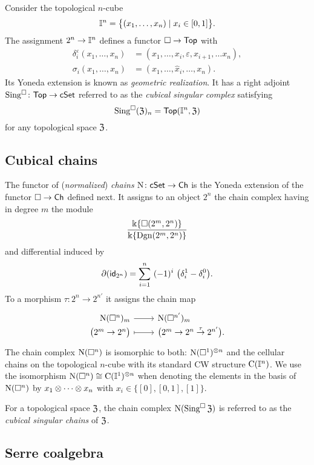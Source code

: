 Consider the topological $n$-cube
\[
\mathbb{I}^{n} = \big\{ (x_1, \dots, x_n) \mid x_i \in [0,1] \big\}.
\]
The assignment $2^n \to \mathbb{I}^n$ defines a functor $\square \to \mathsf{Top}$ with
\begin{align*}
\delta^\varepsilon_i(x_1, \dots, x_n) &= (x_1, \dots, x_i, \varepsilon, x_{i+1}, \dots x_n), \\
\sigma_i(x_1,\dots,x_n) &= (x_1, \dots, \widehat{x}_i, \dots, x_n).
\end{align*}
Its Yoneda extension is known as \textit{geometric realization}.
It has a right adjoint $\operatorname{Sing^{\square}} \colon \mathsf{Top} \to \mathsf{cSet}$ referred to as the \textit{cubical singular complex} satisfying
\[
\operatorname{Sing^{\square}}(\mathfrak{Z})_n = \mathsf{Top}(\mathbb{I}^n, \mathfrak{Z})
\]
for any topological space $\mathfrak{Z}$.

\subsection{Cubical chains}

The functor of (\textit{normalized}) \textit{chains} $\operatorname{N} \colon \mathsf{cSet} \to \mathsf{Ch}$ is the Yoneda extension of the functor $\square \to \mathsf{Ch}$ defined next.
It assigns to an object $2^n$ the chain complex having in degree $m$ the module
\[
\frac{\Bbbk\{\square(2^m, 2^n)\}}{\Bbbk\{\mathrm{Dgn}(2^m, 2^n)\}}
\]
and differential induced by
\[
\bd (\id_{2^n}) = \sum_{i=1}^{n} \ (-1)^i \
\big(\delta_i^1 - \delta_i^0 \big).
\]
To a morphism $\tau \colon 2^n \to 2^{n'}$ it assigns the chain map
\[
\begin{tikzcd}[row sep=-3pt, column sep=normal,
/tikz/column 1/.append style={anchor=base east},
/tikz/column 2/.append style={anchor=base west}]
\chains(\cube^n)_m \arrow[r] & \chains(\cube^{n'})_m \\
\big( 2^m \to 2^n \big) \arrow[r, mapsto] & \big( 2^m \to 2^n \stackrel{\tau}{\to} 2^{n'} \big).
\end{tikzcd}
\]
The chain complex $\operatorname{N}(\square^n)$ is isomorphic to both: $\operatorname{N}(\square^1)^{\otimes n}$ and the cellular chains on the topological $n$-cube with its standard CW structure $\operatorname{C}(\mathbb{I}^n)$.
We use the isomorphism $\operatorname{N}(\square^n) \cong \operatorname{C}(\mathbb{I}^1)^{\otimes n}$ when denoting the elements in the basis of $\operatorname{N}(\square^n)$ by $x_1 \otimes \dotsb \otimes x_n$ with $x_i \in \{[0], [0,1], [1]\}$.

For a topological space $\mathfrak{Z}$, the chain complex $\operatorname{N}(\operatorname{Sing^{\square}} \mathfrak{Z})$ is referred to as the \textit{cubical singular chains} of $\mathfrak{Z}$.

\subsection{Serre coalgebra} \label{ss:serre coalgebra}

